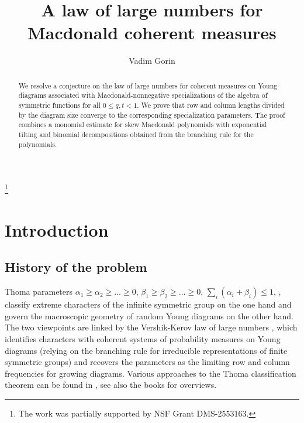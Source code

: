 \documentclass[11pt,reqno]{amsart}
\theoremstyle{definition}
\theoremstyle{remark}
\numberwithin{equation}{section}
\begin{document}
\title{A law of large numbers for Macdonald coherent measures}

\author{Vadim Gorin}


\thanks{The work was partially supported by NSF Grant DMS-2553163.}

\address{University of California at Berkeley}

\date{}

\begin{abstract}
We resolve a conjecture on the law of large numbers for
coherent measures on Young diagrams associated with Macdonald-nonnegative specializations of the algebra of symmetric functions for all $0\le q,t<1$. We prove that row and column lengths divided by the diagram size
converge to the corresponding specialization parameters. The proof combines a
monomial estimate for skew Macdonald polynomials with exponential tilting
and binomial decompositions obtained from the branching rule for the polynomials.
\end{abstract}

\maketitle

\section{Introduction}\label{sec:intro}

\subsection{History of the problem}
Thoma parameters  $\alpha_1\ge \alpha_2\ge\dots\ge 0$, $\beta_1\ge \beta_2\ge\dots\ge 0$, ${\sum_{i}(\alpha_i+\beta_i)\le 1}$, \cite{Edr52,Tho64}, classify extreme characters of
the infinite symmetric group on the one hand and govern the macroscopic geometry of
random Young diagrams on the other hand. The two viewpoints are linked by the Vershik-Kerov law of
large numbers \cite{VK81}, which identifies characters with
coherent systems of probability measures on Young diagrams (relying on the branching rule for irreducible representations of finite symmetric groups) and recovers the parameters as the limiting row
and column frequencies for growing diagrams. Various approaches to the Thoma classification theorem can be found in \cite{Tho64,VK81,KOO98,Oko99,BG15}, see also the books \cite{Ker03,BO16} for overviews.
\end{document}
